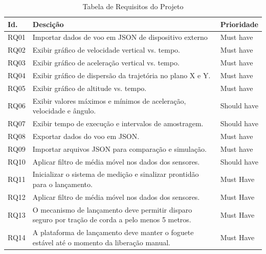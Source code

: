 \begin{samepage}
\begin{table}[H]
\centering
\scriptsize
\setlength{\tabcolsep}{4pt}
\caption{Tabela de Requisitos do Projeto}
\begin{tabular}{|l|p{8cm}|l|}
\hline
Id. & Descição & Prioridade \\
\hline
RQ01 & Importar dados de voo em JSON de dispositivo externo & Must have \\
\hline
RQ02 & Exibir gráfico de velocidade vertical vs. tempo. & Must have \\
\hline
RQ03 & Exibir gráfico de aceleração vertical vs. tempo. & Must have \\
\hline
RQ04 & Exibir gráfico de dispersão da trajetória no plano X e Y. & Must have \\
\hline
RQ05 & Exibir gráfico de altitude vs. tempo. & Must have \\
\hline
RQ06 & Exibir valores máximos e mínimos de aceleração, velocidade e ângulo. & Should have \\
\hline
RQ07 & Exibir tempo de execução e intervalos de amostragem. & Should have \\
\hline
RQ08 & Exportar dados do voo em JSON. & Must have \\
\hline
RQ09 & Importar arquivos JSON para comparação e simulação. & Must have \\
\hline
RQ10 & Aplicar filtro de média móvel nos dados dos sensores. & Should have \\
\hline
RQ11 & Inicializar o sistema de medição e sinalizar prontidão para o lançamento. & Must Have \\
\hline
RQ12 & Aplicar filtro de média móvel nos dados dos sensores. & Must Have \\
\hline
RQ13 & O mecanismo de lançamento deve permitir disparo seguro por tração de corda a pelo menos 5 metros. & Must Have \\
\hline
RQ14 & A plataforma de lançamento deve manter o foguete estável até o momento da liberação manual. & Must Have \\
\hline
\end{tabular}
\label{tab:requisitos_projeto}
\end{table}

\end{samepage}



